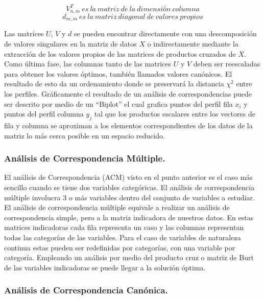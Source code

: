 \[ V^{T}_{n,m} \ es \ la \ matriz \ de \ la \ dimensión \ columna \]
\[ d_{m,m} \ es \ la \ matriz \ diagonal \ de \ valores \ propios \]

Las matrices \(U\), \(V\) y \(d\) se pueden encontrar directamente con
una descomposición de valores singulares en la matriz de datos \(X\) o
indirectamente mediante la extracción de los valores propios de las
matrices de productos cruzados de \(X\). Como última fase, las columnas
tanto de las matrices \(U\) y \(V\) deben ser reescaladas para obtener
los valores óptimos, también llamados valores canónicos. El resultado de
esto da un ordenamiento donde se preservará la distancia \(\chi ^{2}\)
entre los perfiles. Gráficamente el resultado de un análisis de
correspondencias puede ser descrito por medio de un ``Biplot'' el cual
grafica puntos del perfil fila \(x_i\) y puntos del perfil columna
\(y_j\) tal que los productos escalares entre los vectores de fila y
columna se aproximan a los elementos correspondientes de los datos de la
matriz lo más cerca posible en un espacio reducido.

\hypertarget{anuxe1lisis-de-correspondencia-muxfaltiple.}{%
\subsubsection{Análisis de Correspondencia
Múltiple.}\label{anuxe1lisis-de-correspondencia-muxfaltiple.}}

El análisis de Correspondencia (ACM) visto en el punto anterior es el
caso más sencillo cuando se tiene dos variables categóricas. El análisis
de correspondencia múltiple involucra 3 o más variables dentro del
conjunto de variables a estudiar. El análisis de correspondencia
múltiple equivale a realizar un análisis de correspondencia simple, pero
a la matriz indicadora de nuestros datos. En estas matrices indicadoras
cada fila representa un caso y las columnas representan todas las
categorías de las variables. Para el caso de variables de naturaleza
continua estas pueden ser redefinidas por categorías, con una variable
por categoría. Empleando un análisis por medio del producto cruz o
matriz de Burt de las variables indicadoras se puede llegar a la
solución óptima.

\hypertarget{anuxe1lisis-de-correspondencia-canuxf3nica.}{%
\subsubsection{Análisis de Correspondencia
Canónica.}\label{anuxe1lisis-de-correspondencia-canuxf3nica.}}


